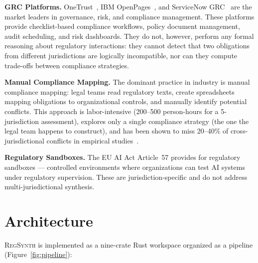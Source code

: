 \documentclass[11pt,twocolumn]{article}
\newcommand{\regsynth}{\textsc{RegSynth}}
\begin{document}
\textbf{GRC Platforms.}
OneTrust~\cite{onetrust2024}, IBM OpenPages~\cite{ibmopenpages2024}, and
ServiceNow GRC~\cite{servicenow2024} are the market leaders in governance, risk,
and compliance management. These platforms provide checklist-based compliance
workflows, policy document management, audit scheduling, and risk dashboards. They
do not, however, perform any formal reasoning about regulatory interactions: they
cannot detect that two obligations from different jurisdictions are logically
incompatible, nor can they compute trade-offs between compliance strategies.

\textbf{Manual Compliance Mapping.}
The dominant practice in industry is manual compliance mapping: legal teams read
regulatory texts, create spreadsheets mapping obligations to organizational
controls, and manually identify potential conflicts. This approach is
labor-intensive (200--500 person-hours for a 5-jurisdiction assessment),
explores only a single compliance strategy (the one the legal team happens
to construct), and has been shown to miss 20--40\% of cross-jurisdictional
conflicts in empirical studies~\cite{hashmi2018compliance}.

\textbf{Regulatory Sandboxes.}
The EU AI Act Article~57 provides for regulatory sandboxes — controlled
environments where organizations can test AI systems under regulatory supervision.
These are jurisdiction-specific and do not address multi-jurisdictional synthesis.

\section{Architecture}
\label{sec:architecture}

\regsynth{} is implemented as a nine-crate Rust workspace organized as a pipeline
(Figure~\ref{fig:pipeline}):
\end{document}
